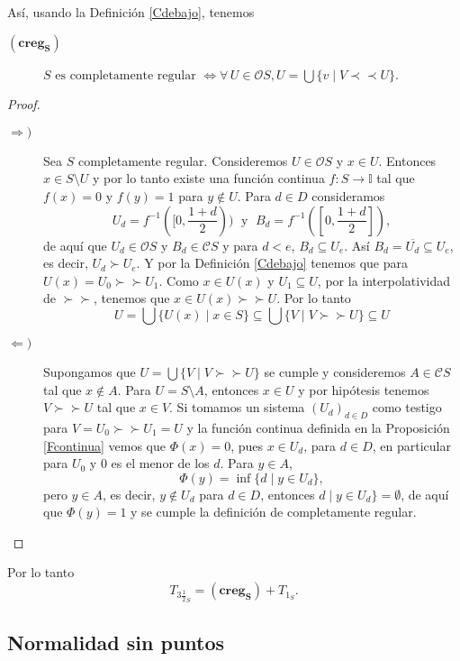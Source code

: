 Así, usando la Definición \ref{Cdebajo}, tenemos 

\begin{description}
\item[$(\mathbf{creg_S})$] $S \mbox{ es completamente regular }\Leftrightarrow \forall\, U\in \mathcal{O}S, U=\bigcup\{v\mid V\prec \prec U\}$.
\end{description}

\begin{proof}
    \begin{description}
        \item[$\Rightarrow )$] Sea $S$ completamente regular. Consideremos $U\in\mathcal{O}S$ y $x\in U$. Entonces $x\in S\setminus U$ y por lo tanto existe una función continua $f\colon S\to \mathbb{I}$ tal que $f(x)=0$ y $f(y)=1$ para $y\notin U$. Para $d\in D$ consideramos
        \[
        U_d=f^{-1}([0, \frac{1+d}{2}))\;\mbox{ y } \;B_d=f^{-1}([0,\frac{1+d}{2}]),
        \]
        de aquí que $U_d\in \mathcal{O}S$ y $B_d\in \mathcal{C}S$ y para $d<e$, $B_d\subseteq U_e$. Así $B_d=\overline{U_d}\subseteq U_e$, es decir, $U_d\succ U_e$. Y por la Definición \ref{Cdebajo} tenemos que para $U(x)=U_0\succ\succ U_1$. Como $x\in U(x)$ y $U_1\subseteq U$, por la interpolatividad de $\succ\succ$, tenemos que $x\in U(x)\succ\succ U$. Por lo tanto
        \[
        U=\bigcup \{U(x)\mid x\in S\}\subseteq \bigcup \{V\mid V\succ\succ U\}\subseteq U
        \]
        \item[$\Leftarrow )$] Supongamos que $U=\bigcup\{V\mid V\succ\succ U\}$ se cumple y consideremos $A\in\mathcal{C}S$ tal que $x\notin A$. Para $U=S\setminus A$, entonces $x\in U$ y por  hipótesis tenemos $V\succ\succ U$ tal que $x\in V$. Si tomamos un sistema $(U_d)_{d\in D}$ como testigo para $V=U_0\succ \succ U_1=U$ y la función continua definida en la Proposición \ref{Fcontinua} vemos que $\Phi(x)=0$, pues $x\in U_d$, para $d\in D$, en particular para $U_0$ y $0$ es el menor de los $d$. Para $y\in A$, 
        \[
        \Phi(y)=\inf\{d\mid y\in U_d\},
        \]
        pero $y\in A$, es decir, $y\notin U_d$ para $d\in D$, entonces $d\mid y\in U_d\}=\emptyset$, de aquí que $\Phi(y)=1$ y se cumple la definición de completamente regular.
    \end{description}
\end{proof}

Por lo tanto 
\[
T_{3\frac{1}{2}_S}=(\mathbf{creg_S})+T_{1_S}.
\]

\subsection{Normalidad sin puntos}

